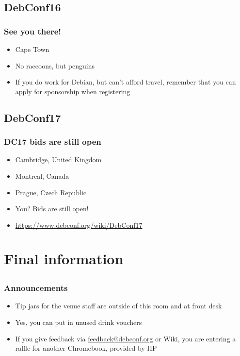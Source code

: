 \documentclass[t]{beamer}
\begin{document}
\subsection{DebConf16}

\begin{frame}
	\frametitle{See you there!}
	\begin{itemize}
		\item Cape Town
		\item No raccoons, but penguins
		\item If you do work for Debian, but can't afford travel, remember that you can apply for sponsorship when registering
\end{itemize}
\end{frame}

\subsection{DebConf17}

\begin{frame}
	\frametitle{DC17 bids are still open}
	\begin{itemize}
		\item Cambridge, United Kingdom
		\item Montreal, Canada
		\item Prague, Czech Republic
		\item You? Bids are still open!
		\item \url{https://www.debconf.org/wiki/DebConf17}
	\end{itemize}
\end{frame}


\section{Final information}

\subsection{}

\begin{frame}
	\frametitle{Announcements}
	\begin{itemize}
		\item Tip jars for the venue staff are outside of this room and at front desk
		\item Yes, you can put in unused drink vouchers
		\item If you give feedback via \url{feedback@debconf.org} or Wiki, you are entering a raffle for another Chromebook, provided by HP
	\end{itemize}
\end{frame}
\end{document}
